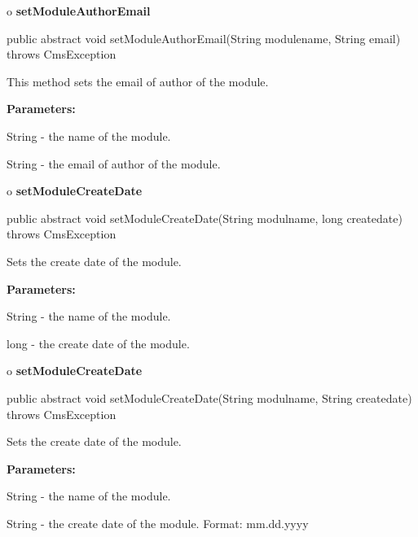 o {\bf setModuleAuthorEmail} 

\begin{PRE}
 public abstract void setModuleAuthorEmail(String modulename,
                                           String email) throws CmsException
\end{PRE}

\begin{description}
\htmlDD This method sets the email of author of the module. 

\begin{description}
\item {\bf Parameters:}  

String - the name of the module.  

String - the email of author of the module.  
\end{description}

\end{description}

o {\bf setModuleCreateDate} 

\begin{PRE}
 public abstract void setModuleCreateDate(String modulname,
                                          long createdate) throws CmsException
\end{PRE}

\begin{description}
\htmlDD Sets the create date of the module. 

\begin{description}
\item {\bf Parameters:}  

String - the name of the module.  

long - the create date of the module.  
\end{description}

\end{description}

o {\bf setModuleCreateDate} 

\begin{PRE}
 public abstract void setModuleCreateDate(String modulname,
                                          String createdate) throws CmsException
\end{PRE}

\begin{description}
\htmlDD Sets the create date of the module. 

\begin{description}
\item {\bf Parameters:}  

String - the name of the module.  

String - the create date of the module. Format: mm.dd.yyyy  
\end{description}

\end{description}

